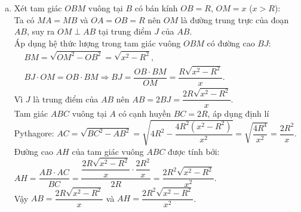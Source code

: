 \begin{bt}
{\begin{enumerate}[a)]
    Suy ra $\widehat{MAK} = \widehat{MKA}$, do đó tam giác $MAK$ cân tại $M \Rightarrow MA = MK$.\\
    Từ đó suy ra $MB = MK$, tức là $M$ là trung điểm của đoạn thẳng $BK$.\\
    Trong tam giác $CKB$, do $AH \parallel BK$, áp dụng hệ quả định lí Thales ta có:
    $\dfrac{IH}{MB} = \dfrac{CI}{CM} = \dfrac{IA}{MK}$.\\
    Vì $MB = MK$ nên $IH = IA$, suy ra $I$ là trung điểm của $AH$.
    \item Xét tam giác $OBM$ vuông tại $B$ có bán kính $OB = R$, $OM = x$ ($x > R$):\\
    Ta có $MA = MB$ và $OA = OB = R$ nên $OM$ là đường trung trực của đoạn $AB$, suy ra $OM \perp AB$ tại trung điểm $J$ của $AB$.\\
    Áp dụng hệ thức lượng trong tam giác vuông $OBM$ có đường cao $BJ$:
    $\begin{aligned}
    &BM = \sqrt{OM^2 - OB^2} = \sqrt{x^2 - R^2}, \\
    &BJ \cdot OM = OB \cdot BM \Rightarrow BJ = \dfrac{OB \cdot BM}{OM} = \dfrac{R\sqrt{x^2 - R^2}}{x}.
    \end{aligned}$\\
    Vì $J$ là trung điểm của $AB$ nên $AB = 2BJ = \dfrac{2R\sqrt{x^2 - R^2}}{x}$.\\
    Tam giác $ABC$ vuông tại $A$ có cạnh huyền $BC = 2R$, áp dụng định lí Pythagore:
    $AC = \sqrt{BC^2 - AB^2} = \sqrt{4R^2 - \dfrac{4R^2(x^2 - R^2)}{x^2}} = \sqrt{\dfrac{4R^4}{x^2}} = \dfrac{2R^2}{x}$.\\
    Đường cao $AH$ của tam giác vuông $ABC$ được tính bởi:
    $AH = \dfrac{AB \cdot AC}{BC} = \dfrac{\dfrac{2R\sqrt{x^2 - R^2}}{x} \cdot \dfrac{2R^2}{x}}{2R} = \dfrac{2R^2\sqrt{x^2 - R^2}}{x^2}$.\\
    Vậy $AB = \dfrac{2R\sqrt{x^2 - R^2}}{x}$ và $AH = \dfrac{2R^2\sqrt{x^2 - R^2}}{x^2}$.
\end{enumerate}
}
\end{bt}


